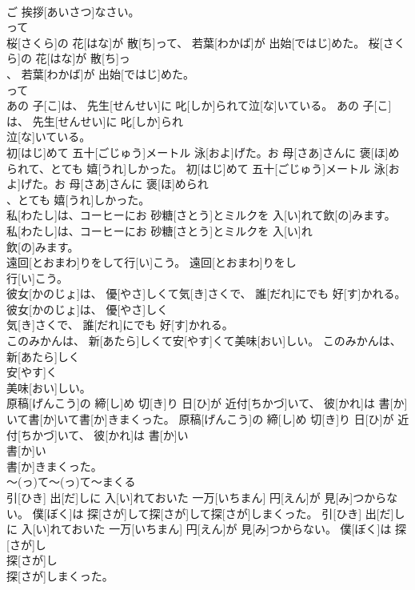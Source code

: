 \documentclass[8pt]{extreport}
\begin{document}
\begin{CJK}{UTF8}{min}
\\	ご 挨拶[あいさつ]なさい。	
\\	って 
\\	桜[さくら]の 花[はな]が 散[ち]って、 若葉[わかば]が 出始[ではじ]めた。	桜[さくら]の 花[はな]が 散[ち]っ
\\	、 若葉[わかば]が 出始[ではじ]めた。	
\\	って 
\\	あの 子[こ]は、 先生[せんせい]に 叱[しか]られて泣[な]いている。	あの 子[こ]は、 先生[せんせい]に 叱[しか]られ
\\	泣[な]いている。	
\\	初[はじ]めて 五十[ごじゅう]メートル 泳[およ]げた。お 母[さあ]さんに 褒[ほ]められて、とても 嬉[うれ]しかった。	初[はじ]めて 五十[ごじゅう]メートル 泳[およ]げた。お 母[さあ]さんに 褒[ほ]められ
\\	、とても 嬉[うれ]しかった。	
\\	私[わたし]は、コーヒーにお 砂糖[さとう]とミルクを 入[い]れて飲[の]みます。	私[わたし]は、コーヒーにお 砂糖[さとう]とミルクを 入[い]れ
\\	飲[の]みます。	
\\	遠回[とおまわ]りをして行[い]こう。	遠回[とおまわ]りをし
\\	行[い]こう。	
\\	彼女[かのじょ]は、 優[やさ]しくて気[き]さくで、 誰[だれ]にでも 好[す]かれる。	彼女[かのじょ]は、 優[やさ]しく
\\	気[き]さくで、 誰[だれ]にでも 好[す]かれる。	
\\	このみかんは、 新[あたら]しくて安[やす]くて美味[おい]しい。	このみかんは、 新[あたら]しく
\\	安[やす]く
\\	美味[おい]しい。	
\\	原稿[げんこう]の 締[し]め 切[き]り 日[ひ]が 近付[ちかづ]いて、 彼[かれ]は 書[か]いて書[か]いて書[か]きまくった。	原稿[げんこう]の 締[し]め 切[き]り 日[ひ]が 近付[ちかづ]いて、 彼[かれ]は 書[か]い
\\	書[か]い
\\	書[か]きまくった。	
\\	～(っ)て～(っ)て～まくる
\\	引[ひき] 出[だ]しに 入[い]れておいた 一万[いちまん] 円[えん]が 見[み]つからない。 僕[ぼく]は 探[さが]して探[さが]して探[さが]しまくった。	引[ひき] 出[だ]しに 入[い]れておいた 一万[いちまん] 円[えん]が 見[み]つからない。 僕[ぼく]は 探[さが]し
\\	探[さが]し
\\	探[さが]しまくった。	

\end{CJK}
\end{document}
